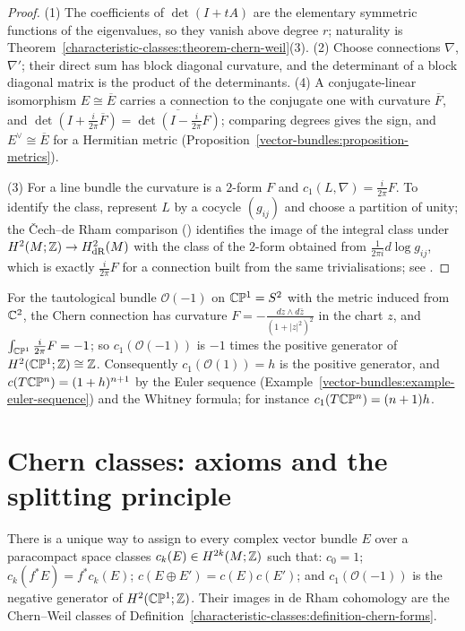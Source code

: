 \begin{proof}
(1) The coefficients of $\det(I + tA)$ are the elementary symmetric functions of the eigenvalues, so they vanish above degree $r$; naturality is
Theorem~\ref{characteristic-classes:theorem-chern-weil}(3). (2) Choose connections $\nabla$, $\nabla'$; their direct sum has block diagonal curvature, and the determinant of a block diagonal matrix is the
product of the determinants. (4) A conjugate-linear isomorphism $E \cong \overline{E}$ carries a connection to the conjugate one with curvature $\overline{F}$, and
$\det(I + \frac{i}{2\pi}\overline{F}) = \overline{\det(I - \frac{i}{2\pi}F)}$; comparing degrees gives the sign, and $E^\vee \cong \overline{E}$ for a Hermitian metric
(Proposition~\ref{vector-bundles:proposition-metrics}).

(3) For a line bundle the curvature is a $2$-form $F$ and $c_1(L, \nabla) = \frac{i}{2\pi}F$. To identify the class, represent $L$ by a cocycle $(g_{ij})$ and choose a partition of unity; the \v{C}ech--de Rham
comparison (\cite[Chapter II]{bott-tu}) identifies the image of the integral class under $H^2(M; \mathbb{Z}) \to H^2_{\mathrm{dR}}(M)$ with the class of the $2$-form obtained from
$\frac{1}{2\pi i}d\log g_{ij}$, which is exactly $\frac{i}{2\pi}F$ for a connection built from the same trivialisations; see \cite[Chapter 1]{griffiths-harris}.
\end{proof}

\begin{example}\label{characteristic-classes:example-tautological}
For the tautological bundle $\mathcal{O}(-1)$ on $\mathbb{C}\mathbb{P}^1 = S^2$ with the metric induced from $\mathbb{C}^2$, the Chern connection has curvature $F = -\frac{dz \wedge d\bar z}{(1 + |z|^2)^2}$ in the chart
$z$, and $\int_{\mathbb{C}\mathbb{P}^1}\frac{i}{2\pi}F = -1$; so $c_1(\mathcal{O}(-1))$ is $-1$ times the positive generator of $H^2(\mathbb{C}\mathbb{P}^1; \mathbb{Z}) \cong \mathbb{Z}$. Consequently $c_1(\mathcal{O}(1)) = h$ is the positive
generator, and $c(T\mathbb{C}\mathbb{P}^n) = (1 + h)^{n+1}$ by the Euler sequence (Example~\ref{vector-bundles:example-euler-sequence}) and the Whitney formula; for instance $c_1(T\mathbb{C}\mathbb{P}^n) = (n+1)h$.
\end{example}

\section{Chern classes: axioms and the splitting principle}\label{characteristic-classes:section-axioms}

\begin{theorem}\label{characteristic-classes:theorem-chern-axioms}
There is a unique way to assign to every complex vector bundle $E$ over a paracompact space classes $c_k(E) \in H^{2k}(M; \mathbb{Z})$ such that: $c_0 = 1$; $c_k(f^*E) = f^*c_k(E)$; $c(E \oplus E') = c(E)c(E')$;
and $c_1(\mathcal{O}(-1))$ is the negative generator of $H^2(\mathbb{C}\mathbb{P}^1; \mathbb{Z})$. Their images in de Rham cohomology are the Chern--Weil classes of
Definition~\ref{characteristic-classes:definition-chern-forms}.
\end{theorem}

